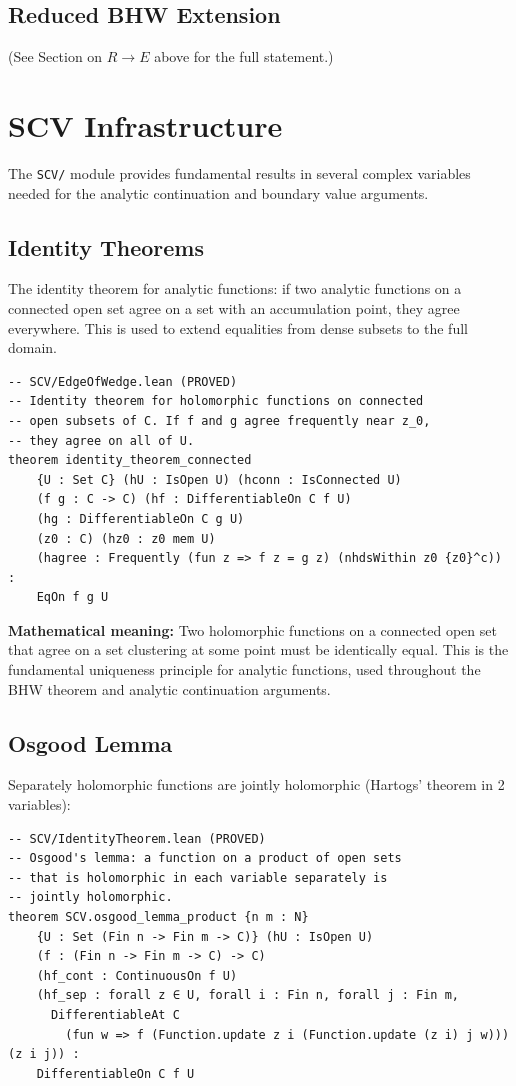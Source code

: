 \documentclass[11pt,a4paper]{article}
\begin{document}
\subsection{Reduced BHW Extension}

(See Section on $R \to E$ above for the full statement.)


\section{SCV Infrastructure}

The \texttt{SCV/} module provides fundamental results in several complex
variables needed for the analytic continuation and boundary value arguments.

\subsection{Identity Theorems}

The identity theorem for analytic functions: if two analytic functions
on a connected open set agree on a set with an accumulation point, they
agree everywhere. This is used to extend equalities from dense subsets
to the full domain.

\begin{lstlisting}
-- SCV/EdgeOfWedge.lean (PROVED)
-- Identity theorem for holomorphic functions on connected
-- open subsets of C. If f and g agree frequently near z_0,
-- they agree on all of U.
theorem identity_theorem_connected
    {U : Set C} (hU : IsOpen U) (hconn : IsConnected U)
    (f g : C -> C) (hf : DifferentiableOn C f U)
    (hg : DifferentiableOn C g U)
    (z0 : C) (hz0 : z0 mem U)
    (hagree : Frequently (fun z => f z = g z) (nhdsWithin z0 {z0}^c)) :
    EqOn f g U
\end{lstlisting}

\noindent\textbf{Mathematical meaning:} Two holomorphic functions on a
connected open set that agree on a set clustering at some point must be
identically equal. This is the fundamental uniqueness principle for
analytic functions, used throughout the BHW theorem and analytic
continuation arguments.

\subsection{Osgood Lemma}

Separately holomorphic functions are jointly holomorphic (Hartogs' theorem
in 2 variables):

\begin{lstlisting}
-- SCV/IdentityTheorem.lean (PROVED)
-- Osgood's lemma: a function on a product of open sets
-- that is holomorphic in each variable separately is
-- jointly holomorphic.
theorem SCV.osgood_lemma_product {n m : N}
    {U : Set (Fin n -> Fin m -> C)} (hU : IsOpen U)
    (f : (Fin n -> Fin m -> C) -> C)
    (hf_cont : ContinuousOn f U)
    (hf_sep : forall z ∈ U, forall i : Fin n, forall j : Fin m,
      DifferentiableAt C
        (fun w => f (Function.update z i (Function.update (z i) j w))) (z i j)) :
    DifferentiableOn C f U
\end{lstlisting}
\end{document}

